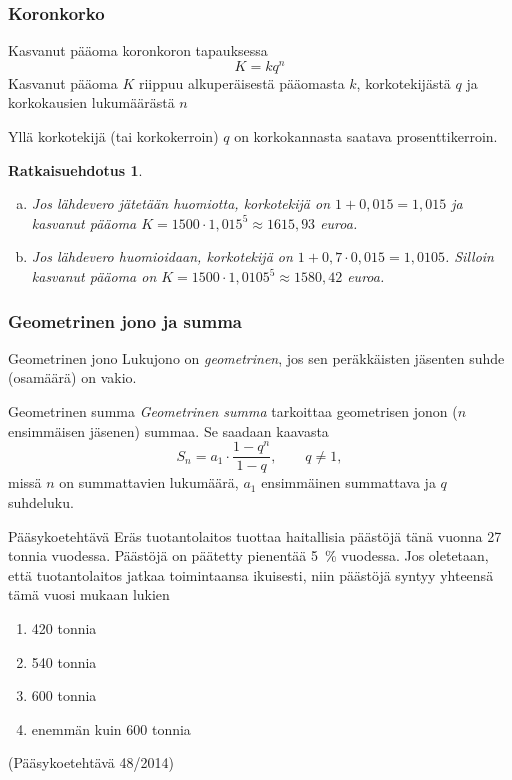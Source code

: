 \documentclass[]{beamer}\usepackage[]{graphicx}\usepackage[]{color}
\newtheorem{ratkaisu}{Ratkaisuehdotus}
\begin{document}
\begin{frame}
\frametitle{Koronkorko}
	\begin{block}{Kasvanut pääoma koronkoron tapauksessa}
		\[
			K = kq^n
		\]
		Kasvanut pääoma \(K\) riippuu alkuperäisestä pääomasta \(k\), korkotekijästä \(q\) ja korkokausien lukumäärästä \(n\)
	\end{block}
	Yllä korkotekijä (tai korkokerroin) \(q\) on korkokannasta saatava prosenttikerroin.
\end{frame}

\begin{frame}
 	\begin{ratkaisu}
 		\begin{enumerate}[(a)]
 			\item Jos lähdevero jätetään huomiotta, korkotekijä on \(1+ 0,015 = 1,015\) ja kasvanut pääoma
 			\(K=1500\cdot1,015^5\approx 1615,93\) euroa.
 			\item Jos lähdevero huomioidaan, korkotekijä on \(1+0,7\cdot0,015=	1,0105\). Silloin kasvanut pääoma on
 			\(K=1500\cdot1,0105^5\approx	1580,42\) euroa.
 		\end{enumerate}
 	\end{ratkaisu}
\end{frame}

\begin{frame}
    \frametitle{Geometrinen jono ja summa}
    \pause
    \begin{block}{Geometrinen jono}
        Lukujono on \emph{geometrinen}, jos sen peräkkäisten jäsenten suhde (osamäärä) on vakio.
    \end{block}
    \pause
    \begin{block}{Geometrinen summa}
        \emph{Geometrinen summa} tarkoittaa geometrisen jonon ($n$ ensimmäisen jäsenen) summaa. Se saadaan kaavasta
        \[
            S_n = a_1\cdot \frac{1-q^n}{1-q}, \qquad q\neq 1,
        \] \pause
        missä \(n\) on summattavien lukumäärä,
        \pause \(a_1\) ensimmäinen summattava
        \pause ja \(q\) suhdeluku.
    \end{block}
\end{frame}

\begin{frame}
  \begin{block}{Pääsykoetehtävä}
    Eräs tuotantolaitos tuottaa haitallisia päästöjä tänä vuonna 27 tonnia vuodessa.
Päästöjä on päätetty pienentää 5~\% vuodessa. Jos oletetaan, että tuotantolaitos jatkaa
toimintaansa ikuisesti, niin päästöjä syntyy yhteensä tämä vuosi mukaan lukien
    \begin{enumerate}
      \item 420 tonnia
      \item 540 tonnia
      \item 600 tonnia
      \item enemmän kuin 600 tonnia
    \end{enumerate}
    (Pääsykoetehtävä 48/2014)
  \end{block}
\end{frame}
\end{document}
